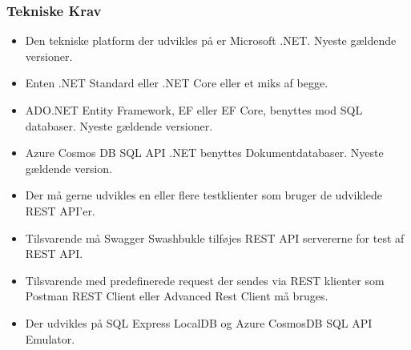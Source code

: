 \subsubsection{Tekniske Krav}

\begin{itemize}
    \item Den tekniske  platform der udvikles på er Microsoft .NET. Nyeste gældende versioner.
    \item Enten .NET Standard eller .NET Core eller et miks af begge. 
    \item ADO.NET Entity Framework, EF eller EF Core, benyttes mod SQL databaser. Nyeste gældende versioner.
    \item Azure Cosmos DB SQL API .NET benyttes Dokumentdatabaser. Nyeste gældende version.
    \item Der må gerne udvikles en eller flere testklienter som bruger de udviklede REST API'er.
    \item Tilsvarende må Swagger Swashbukle tilføjes REST API servererne for test af REST API.
    \item Tilsvarende med predefinerede request der sendes via REST klienter som Postman REST Client eller Advanced Rest Client må bruges.
    \item Der udvikles på SQL Express LocalDB og Azure CosmosDB SQL API Emulator.
\end{itemize}



